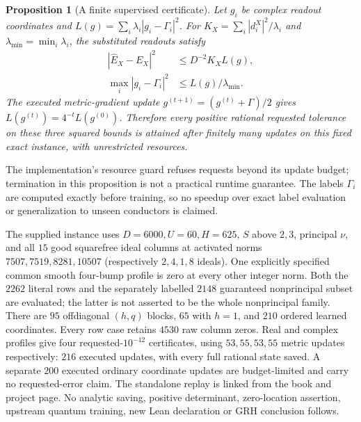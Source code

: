 \documentclass[11pt,oneside,openany]{book}
\newtheorem{proposition}[theorem]{Proposition}
\theoremstyle{definition}\newtheorem{definition}[theorem]{Definition}
\theoremstyle{remark}\newtheorem{remark}[theorem]{Remark}
\begin{document}
\begin{proposition}[A finite supervised certificate]\label{arl:certificate}
Let $g_i$ be complex readout coordinates and
$L(g)=\sum_i\lambda_i|g_i-\Gamma_i|^2$.
For $K_X=\sum_i|d_i^X|^2/\lambda_i$ and
$\lambda_{\min}=\min_i\lambda_i$, the substituted readouts satisfy
\begin{align*}
 |\widehat E_X-E_X|^2&\le D^{-2}K_X L(g),\\
 \max_i|g_i-\Gamma_i|^2&\le L(g)/\lambda_{\min}.
\end{align*}
The executed metric-gradient update $g^{(t+1)}=(g^{(t)}+\Gamma)/2$
gives $L(g^{(t)})=4^{-t}L(g^{(0)})$. Therefore every positive rational
requested tolerance on these three squared bounds is attained after finitely
many updates on this fixed exact instance, with unrestricted resources.
\end{proposition}
The implementation's resource guard refuses requests beyond its update budget;
termination in this proposition is not a practical runtime guarantee.
The labels $\Gamma_i$ are computed exactly before training, so no speedup over
exact label evaluation or generalization to unseen conductors is claimed.

The supplied instance uses $D=6000,U=60,H=625$, $S$ above $2,3$, principal
$\nu$, and all $15$ good squarefree ideal columns at activated norms
$7507,7519,8281,10507$ (respectively $2,4,1,8$ ideals).
One explicitly specified common smooth four-bump profile is zero at every
other integer norm. Both the $2262$ literal rows and the separately labelled
$2148$ guaranteed nonprincipal subset are evaluated; the latter is not
asserted to be the whole nonprincipal family.
There are $95$ offdiagonal $(h,q)$ blocks, $65$ with $h=1$, and $210$
ordered learned coordinates. Every row case retains $4530$ raw column zeros.
Real and complex profiles give four requested-$10^{-12}$ certificates,
using $53,55,53,55$ metric updates respectively: $216$ executed updates,
with every full rational state saved. A separate $200$ executed ordinary
coordinate updates are budget-limited and carry no requested-error claim.
The standalone replay is linked from the book and project page.
No analytic saving, positive determinant, zero-location assertion,
upstream quantum training, new Lean declaration or GRH conclusion follows.

\end{document}
